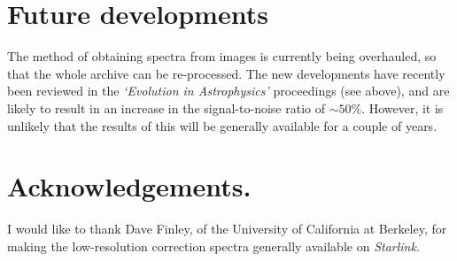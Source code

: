 \section{Future developments}

The method of obtaining spectra from images is currently being overhauled, so 
that the whole archive can be re-processed. The new developments have recently 
been reviewed in the {\em `Evolution in Astrophysics'} proceedings (see above),
and are likely to result in an increase in the signal-to-noise ratio of $\sim 
50$\%. However, it is unlikely that the results of this will be generally 
available for a couple of years. 

\section*{Acknowledgements.}

I would like to thank Dave Finley, of the University of California at
Berkeley, for making the low-resolution correction spectra generally 
available on {\it Starlink}. 


